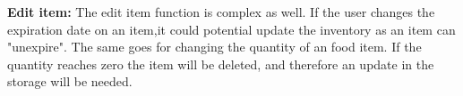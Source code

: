 \begin{table}[H]
\begin{flushleft}
    \textbf{Edit item:} The edit item function is complex as well. If the user changes the expiration date on an item,it could potential update the inventory as an item can "unexpire". The same goes for changing the quantity of an food item. If the quantity reaches zero the item will be deleted, and therefore an update in the storage will be needed.
  \end{flushleft}
\end{table}